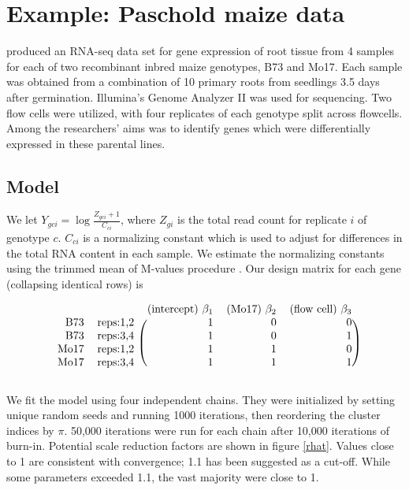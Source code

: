 \section{Example: Paschold maize data}
\label{sec:analysis}
\citet{paschold} produced an RNA-seq data set for gene expression of root tissue from 4 samples for each of two recombinant inbred maize genotypes, B73 and Mo17. Each sample was obtained from a combination of 10 primary roots from seedlings 3.5 days after germination. Illumina's Genome Analyzer II was used for sequencing. Two flow cells were utilized, with four replicates of each genotype split across flowcells. Among the researchers' aims was to identify genes which were differentially expressed in these parental lines.

\subsection{Model}
We let $Y_{gci} = \log \frac{Z_{gci}+1}{C_{ci}}$, where $Z_{gi}$ is the total read count for replicate $i$ of genotype $c$. $C_{ci}$ is a normalizing constant which is used to adjust for differences in the total RNA content in each sample. We estimate the normalizing constants using the trimmed mean of M-values procedure \cite{robinson2010}. Our design matrix for each gene (collapsing identical rows) is

\begin{equation*}
\begin{blockarray}{rlrrr}
  && \mbox{(intercept) }\beta_1 & \mbox{(Mo17) }\beta_2 & \mbox{(flow cell) }\beta_3\\
  \begin{block}{rl(rrr)}
  \mbox{B73}    &\mbox{reps:1,2} & 1 & 0 & 0\\
  \mbox{B73}    &\mbox{reps:3,4} & 1 & 0 & 1\\
  \mbox{Mo17}   &\mbox{reps:1,2} & 1 & 1 & 0\\
  \mbox{Mo17}   &\mbox{reps:3,4} & 1 & 1 & 1\\
  \end{block}
\end{blockarray}
\label{design}
\end{equation*}

We fit the model using four independent chains. They were initialized by setting unique random seeds and running 1000 iterations, then reordering the cluster indices by $\pi$. 50,000 iterations were run for each chain after 10,000 iterations of burn-in. Potential scale reduction factors are shown in figure \ref{rhat}. Values close to 1 are consistent with convergence; 1.1 has been suggested as a cut-off. While some parameters exceeded 1.1, the vast majority were close to 1.

